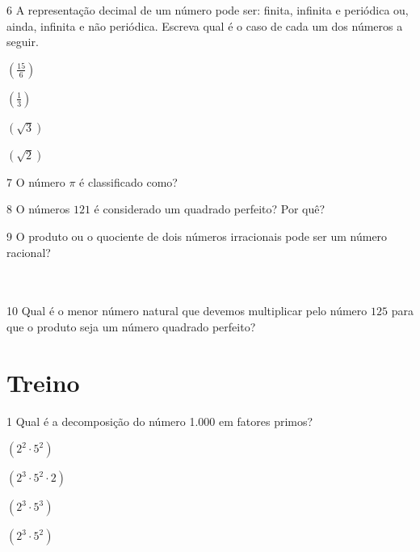\num{6} A representação decimal de um número pode ser: finita, infinita e
periódica ou, ainda, infinita e não periódica. Escreva qual é o caso de
cada um dos números a seguir.

\begin{escolha}[itemsep=0pt]
\item $(\frac{15}{6})$ 
\item $(\frac{1}{3})$ 
\item $(\sqrt{3})$ 
\item $(\sqrt{2})$ 
\end{escolha}


\num{7} O número $\pi$ é classificado como?

\num{8} O números $121$ é considerado um quadrado perfeito? Por quê?

\num{9} O produto ou o quociente de dois números irracionais pode ser um
número racional?

\\
\\


\num{10} Qual é o menor número natural que devemos multiplicar pelo número
$125$ para que o produto seja um número quadrado perfeito?
\\

\section*{Treino}

\num{1} Qual é a decomposição do número 1.000 em fatores primos?

\begin{escolha}[itemsep=0pt]
\item $(2^2 \cdot 5^2)$
\item $(2^3 \cdot 5^2 \cdot 2)$
\item $(2^3 \cdot 5^3)$
\item $(2^3 \cdot 5^2)$
\end{escolha}




